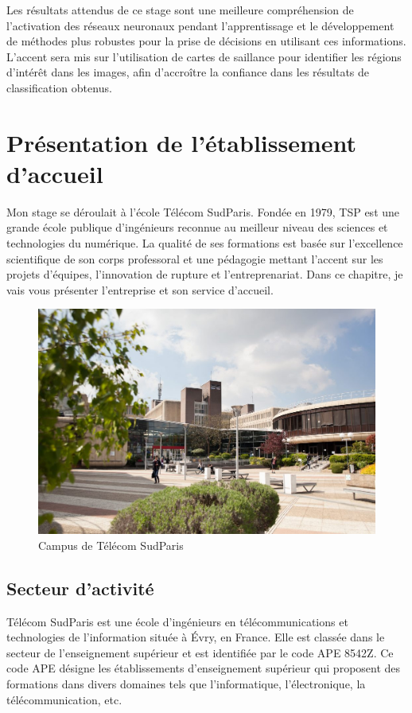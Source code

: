 \documentclass{report}
\begin{document}
{\hspace{1.6cm} Les résultats attendus de ce stage sont une meilleure compréhension de l'activation des réseaux neuronaux pendant l'apprentissage et le développement de méthodes plus robustes pour la prise de décisions en utilisant ces informations. L'accent sera mis sur l'utilisation de cartes de saillance pour identifier les régions d'intérêt dans les images, afin d'accroître la confiance dans les résultats de classification obtenus.

\chapter{Présentation de l’établissement d’accueil }
\hspace{1.6cm}Mon stage se déroulait à l'école Télécom SudParis. Fondée en 1979, TSP est une grande école publique d'ingénieurs reconnue au meilleur niveau des sciences et technologies du numérique. La qualité de ses formations est basée sur l’excellence scientifique de son corps professoral et une pédagogie mettant l’accent sur les projets d’équipes, l’innovation de rupture et l’entreprenariat. Dans ce chapitre, je vais vous présenter l'entreprise et son service d'accueil.
\begin{figure}[htbp] 
	\centering
        \includegraphics[width=11.5cm]{logo/telecomsudparis.jpg} 
	\caption{Campus de Télécom SudParis}
	\label{fig:Aperçu de Grad-CAM}
\end{figure}
\section{Secteur d'activité }
\hspace{1.6cm} Télécom SudParis est une école d'ingénieurs en télécommunications et technologies de l'information située à Évry, en France. Elle est classée dans le secteur de l'enseignement supérieur et est identifiée par le code APE 8542Z. Ce code APE désigne les établissements d'enseignement supérieur qui proposent des formations dans divers domaines tels que l'informatique, l'électronique, la télécommunication, etc.
\vspace*{0.5\baselineskip}
\newpage

}
\end{document}
